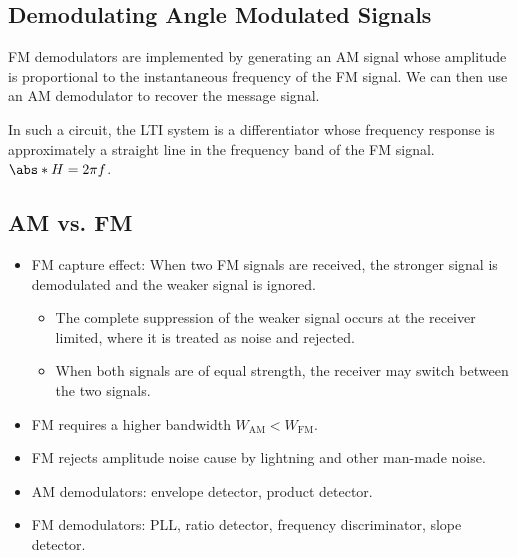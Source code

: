 \documentclass{article}
\begin{document}
\subsection{Demodulating Angle Modulated Signals}
FM demodulators are implemented by generating an AM signal whose amplitude is proportional to the instantaneous frequency of the
FM signal. We can then use an AM demodulator to recover the message signal.

In such a circuit, the LTI system is a differentiator whose frequency response is approximately a straight
line in the frequency band of the FM signal. \(\abs*{H} = 2 \pi f\).
\subsection{AM vs. FM}
\begin{itemize}
    \item FM capture effect: When two FM signals are received, the stronger signal is demodulated and the weaker signal is ignored.
    \begin{itemize}
        \item The complete suppression of the weaker signal occurs at the receiver limited, where it is treated as noise and rejected.
        \item When both signals are of equal strength, the receiver may switch between the two signals.
    \end{itemize}
    \item FM requires a higher bandwidth \(W_{\mathrm{AM}} < W_{\mathrm{FM}}\).
    \item FM rejects amplitude noise cause by lightning and other man-made noise.
    \item AM demodulators: envelope detector, product detector.
    \item FM demodulators: PLL, ratio detector, frequency discriminator, slope detector.
\end{itemize}
\end{document}
